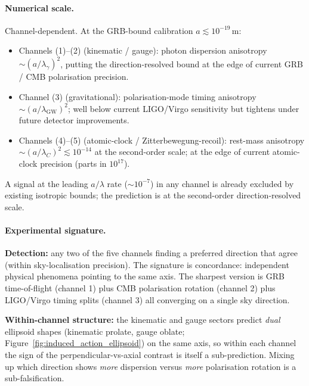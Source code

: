 \paragraph{Numerical scale.}
Channel-dependent.  At the GRB-bound calibration
$a \lesssim 10^{-19}\,\text{m}$:
\begin{itemize}
    \item Channels (1)--(2) (kinematic / gauge): photon dispersion
        anisotropy $\sim (a/\lambda_\gamma)^2$, putting the
        direction-resolved bound at the edge of current GRB / CMB
        polarisation precision.
    \item Channel (3) (gravitational): polarisation-mode timing
        anisotropy $\sim (a/\lambda_\text{GW})^2$; well below current
        LIGO/Virgo sensitivity but tightens under future detector
        improvements.
    \item Channels (4)--(5) (atomic-clock / Zitterbewegung-recoil):
        rest-mass anisotropy $\sim (a/\lambda_C)^2 \lesssim 10^{-14}$
        at the second-order scale; at the edge of current
        atomic-clock precision (parts in $10^{17}$).
\end{itemize}
A signal at the leading $a/\lambda$ rate ($\sim 10^{-7}$) in any
channel is already excluded by existing isotropic bounds; the
prediction is at the second-order direction-resolved scale.

\paragraph{Experimental signature.}
\textbf{Detection:} any two of the five channels finding a preferred
direction that agree (within sky-localisation precision).  The
signature is concordance: independent physical phenomena pointing to
the same axis.  The sharpest version is GRB time-of-flight (channel
1) plus CMB polarisation rotation (channel 2) plus LIGO/Virgo timing
splits (channel 3) all converging on a single sky direction.

\textbf{Within-channel structure:}  the kinematic and gauge sectors
predict \emph{dual} ellipsoid shapes (kinematic prolate, gauge
oblate; Figure~\ref{fig:induced_action_ellipsoid}) on the same axis,
so within each channel the sign of the perpendicular-vs-axial contrast
is itself a sub-prediction.  Mixing up which direction shows
\emph{more} dispersion versus \emph{more} polarisation rotation is a
sub-falsification.

